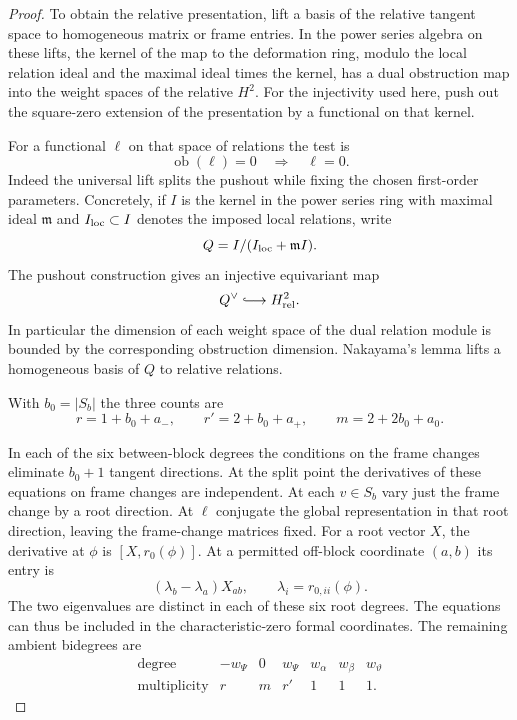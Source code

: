 \begin{proof}
To obtain the relative presentation, lift a basis of the
relative tangent space to homogeneous matrix or frame entries.
In the power series algebra on these lifts, the kernel of the
map to the deformation ring, modulo the local relation ideal
and the maximal ideal times the kernel, has a dual obstruction
map into the weight spaces of the relative \(H^2\). For the
injectivity used here, push out the square-zero extension of the
presentation by a functional on that kernel.

For a functional \(\ell\) on that space of relations the test is
\[
 \operatorname{ob}(\ell)=0\quad\Longrightarrow\quad\ell=0.
\]
Indeed the universal lift splits the pushout while fixing the chosen first-order parameters.
Concretely, if \(I\) is the kernel in the power series ring with maximal ideal \(\mathfrak m\) and \(I_{\rm loc}\subset I\) denotes the imposed local relations, write
\[
 Q=I/(I_{\rm loc}+\mathfrak m I).
\]
The pushout construction gives an injective equivariant map
\[
 Q^\vee\lhook\joinrel\longrightarrow H^2_{\rm rel}.
\]
In particular the dimension of each weight space of the dual relation module is bounded by the corresponding obstruction dimension. Nakayama's lemma lifts a homogeneous basis of \(Q\) to relative relations.
\label{cor:ordinary-symplectic-cohomology-3}

With \(b_0=|S_b|\) the three counts are
\[
 r=1+b_0+a_-,\qquad r'=2+b_0+a_+,\qquad m=2+2b_0+a_0.
\]

In each of the six between-block degrees the conditions on the
frame changes eliminate \(b_0+1\) tangent directions. At the
split point the derivatives of these equations on frame changes
are independent. At each \(v\in S_b\) vary just the frame
change by a root direction. At \(\ell\) conjugate the global
representation in that root direction, leaving the frame-change
matrices fixed. For a root vector \(X\), the derivative at \(\phi\) is
\([X,r_0(\phi)]\). At a permitted off-block coordinate \((a,b)\)
its entry is
\[
      (\lambda_b-\lambda_a)X_{ab},
         \qquad\lambda_i=r_{0,ii}(\phi).
\]
The two eigenvalues are distinct in each of these six root degrees.
The equations can thus be included in the characteristic-zero
formal coordinates. The remaining ambient bidegrees are
\[
 \begin{array}{c|rrrrrr}
  \text{degree}&-w_\Psi&0&w_\Psi&w_\alpha&w_\beta&w_\vartheta\\ \hline
  \text{multiplicity}&r&m&r'&1&1&1 .
 \end{array}
\]


\end{proof}
